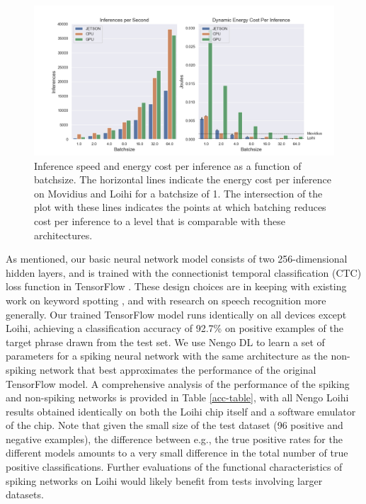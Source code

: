 \documentclass{article}
\begin{document}
\begin{figure}[ht!]
\centering
    \includegraphics[width=6.5in]{./figures/batch_comparison.png}
    \caption{Inference speed and energy cost per inference as a function of batchsize. The horizontal lines indicate the energy cost per inference on Movidius and Loihi for a batchsize of 1. The intersection of the plot with these lines indicates the points at which batching reduces cost per inference to a level that is comparable with these architectures.}
\label{batchsize_fig}
\end{figure}

As mentioned, our basic neural network model consists of two 256-dimensional hidden layers, and is trained with the connectionist temporal classification (CTC) loss function \cite{Graves:2006} in TensorFlow \cite{Abadi:2016}. These design choices are in keeping with existing work on keyword spotting \cite{Chen:2014}, and with research on speech recognition more generally. Our trained TensorFlow model runs identically on all devices except Loihi, achieving a classification accuracy of 92.7\% on positive examples of the target phrase drawn from the test set. We use Nengo DL \citep{Rasmussen:2018} to learn a set of parameters for a spiking neural network with the same architecture as the non-spiking network that best approximates the performance of the original TensorFlow model. A comprehensive analysis of the performance of the spiking and non-spiking networks is provided in Table \ref{acc-table}, with all Nengo Loihi results obtained identically on both the Loihi chip itself and a software emulator of the chip. Note that given the small size of the test dataset (96 positive and negative examples), the difference between e.g., the true positive rates for the different models amounts to a very small difference in the total number of true positive classifications. Further evaluations of the functional characteristics of spiking networks on Loihi would likely benefit from tests involving larger datasets. 
\end{document}
